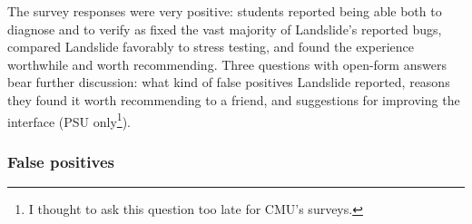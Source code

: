 The survey responses were very positive:
students reported being able both to diagnose and to verify as fixed the vast majority of Landslide's reported bugs,
compared Landslide favorably to stress testing,
and found the experience worthwhile and worth recommending.
Three questions with open-form answers bear further discussion:
what kind of false positives Landslide reported, %
reasons they found it worth recommending to a friend,
and suggestions for improving the interface
(PSU only\footnote{I thought to ask this question too late for CMU's surveys.}). %

\subsubsection{False positives}

